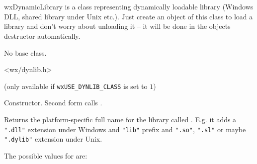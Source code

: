 
\section{}\label{wxdynamiclibrary}

wxDynamicLibrary is a class representing dynamically loadable library
(Windows DLL, shared library under Unix etc.). Just create an object of
this class to load a library and don't worry about unloading it -- it will be
done in the objects destructor automatically.


No base class.


<wx/dynlib.h>

(only available if \texttt{wxUSE\_DYNLIB\_CLASS} is set to $1$)


\label{wxdynamiclibrarywxdynamiclibrary}



Constructor. Second form calls .


\label{wxdynamiclibrarycanonicalizename}


Returns the platform-specific full name for the library called . E.g.
it adds a {\tt ".dll"} extension under Windows and {\tt "lib"} prefix and 
{\tt ".so"}, {\tt ".sl"} or maybe {\tt ".dylib"} extension under Unix.

The possible values for  are:

\begin{twocollist}
\end{twocollist}


